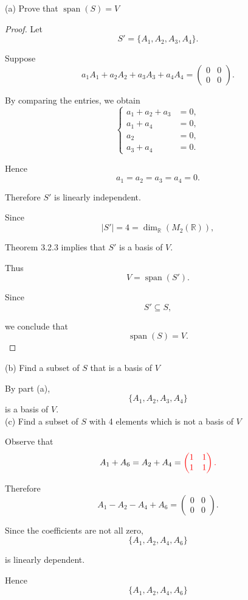 \documentclass[12pt]{article}
\begin{document}
(a)
Prove that $\operatorname{span}(S) = V$

\newpage

\begin{proof}
Let
\[
S'=\{A_1,A_2,A_3,A_4\}.
\]

Suppose
\[
a_1A_1+a_2A_2+a_3A_3+a_4A_4
=
\begin{pmatrix}
0&0\\
0&0
\end{pmatrix}.
\]

By comparing the entries, we obtain
\[
\left\{
\begin{aligned}
a_1+a_2+a_3 &=0,\\
a_1+a_4 &=0,\\
a_2 &=0,\\
a_3+a_4 &=0.
\end{aligned}
\right.
\]

Hence
\[
a_1=a_2=a_3=a_4=0.
\]

Therefore $S'$ is linearly independent.

Since
\[
|S'|=4
=
\dim_{\mathbb R}(M_2(\mathbb R)),
\]

Theorem 3.2.3 implies that $S'$ is a basis of $V$.

Thus
\[
V=\operatorname{span}(S').
\]

Since
\[
S'\subseteq S,
\]

we conclude that
\[
\operatorname{span}(S)=V.
\]
\end{proof}

(b)
Find a subset of $S$ that is a basis of $V$

By part (a),
\[
\{A_1,A_2,A_3,A_4\}
\]
is a basis of $V$.\\

(c)
Find a subset of $S$ with 4 elements which is not a basis of $V$

Observe that
\[
A_1+A_6=A_2+A_4
=
\textcolor{red}{
\begin{pmatrix}
1&1\\
1&1
\end{pmatrix}.
}
\]

Therefore
\[
A_1-A_2-A_4+A_6
=
\begin{pmatrix}
0&0\\
0&0
\end{pmatrix}.
\]

Since the coefficients are not all zero,
\[
\{A_1,A_2,A_4,A_6\}
\]

is linearly dependent.

Hence
\[
\{A_1,A_2,A_4,A_6\}
\]
\end{document}
